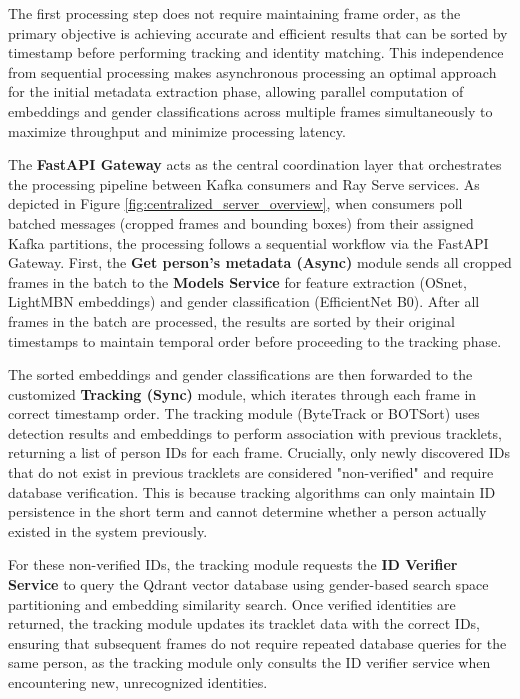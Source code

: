The first processing step does not require maintaining frame order, as the primary objective is achieving accurate and efficient results that can be sorted by timestamp before performing tracking and identity matching. This independence from sequential processing makes asynchronous processing an optimal approach for the initial metadata extraction phase, allowing parallel computation of embeddings and gender classifications across multiple frames simultaneously to maximize throughput and minimize processing latency.


The \textbf{FastAPI Gateway} acts as the central coordination layer that orchestrates the processing pipeline between Kafka consumers and Ray Serve services. As depicted in Figure \ref{fig:centralized_server_overview}, when consumers poll batched messages (cropped frames and bounding boxes) from their assigned Kafka partitions, the processing follows a sequential workflow via the FastAPI Gateway. First, the \textbf{Get person's metadata (Async)} module sends all cropped frames in the batch to the \textbf{Models Service} for feature extraction (OSnet, LightMBN embeddings) and gender classification (EfficientNet B0). After all frames in the batch are processed, the results are sorted by their original timestamps to maintain temporal order before proceeding to the tracking phase.

The sorted embeddings and gender classifications are then forwarded to the customized \textbf{Tracking (Sync)} module, which iterates through each frame in correct timestamp order. The tracking module (ByteTrack or BOTSort) uses detection results and embeddings to perform association with previous tracklets, returning a list of person IDs for each frame. Crucially, only newly discovered IDs that do not exist in previous tracklets are considered "non-verified" and require database verification. This is because tracking algorithms can only maintain ID persistence in the short term and cannot determine whether a person actually existed in the system previously.

For these non-verified IDs, the tracking module requests the \textbf{ID Verifier Service} to query the Qdrant vector database using gender-based search space partitioning and embedding similarity search. Once verified identities are returned, the tracking module updates its tracklet data with the correct IDs, ensuring that subsequent frames do not require repeated database queries for the same person, as the tracking module only consults the ID verifier service when encountering new, unrecognized identities.

